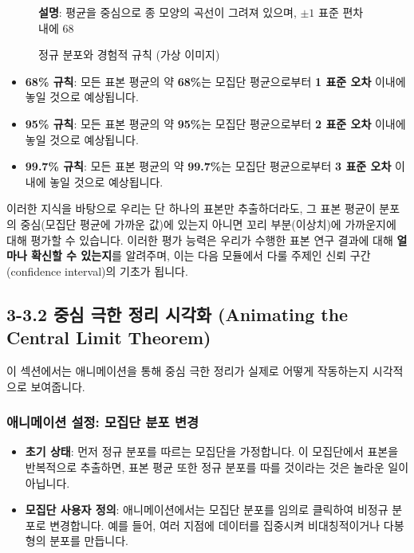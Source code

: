 \documentclass[11pt,a4paper]{book}
\theoremstyle{definition}
\begin{document}
\begin{figure}[h!]
    \centering
    \caption{정규 분포와 경험적 규칙 (가상 이미지)}
    \label{fig:empirical_rule}
    \textbf{설명}: 평균을 중심으로 종 모양의 곡선이 그려져 있으며, $\pm 1$ 표준 편차 내에 68%
\end{figure}

\begin{itemize}
    \item \textbf{68\% 규칙}: 모든 표본 평균의 약 \textbf{68\%}는 모집단 평균으로부터 \textbf{1 표준 오차} 이내에 놓일 것으로 예상됩니다.
    \item \textbf{95\% 규칙}: 모든 표본 평균의 약 \textbf{95\%}는 모집단 평균으로부터 \textbf{2 표준 오차} 이내에 놓일 것으로 예상됩니다.
    \item \textbf{99.7\% 규칙}: 모든 표본 평균의 약 \textbf{99.7\%}는 모집단 평균으로부터 \textbf{3 표준 오차} 이내에 놓일 것으로 예상됩니다.
\end{itemize}

이러한 지식을 바탕으로 우리는 단 하나의 표본만 추출하더라도, 그 표본 평균이 분포의 중심(모집단 평균에 가까운 값)에 있는지 아니면 꼬리 부분(이상치)에 가까운지에 대해 평가할 수 있습니다. 이러한 평가 능력은 우리가 수행한 표본 연구 결과에 대해 \textbf{얼마나 확신할 수 있는지}를 알려주며, 이는 다음 모듈에서 다룰 주제인 신뢰 구간(confidence interval)의 기초가 됩니다.


\subsection{3-3.2 중심 극한 정리 시각화 (Animating the Central Limit Theorem)}

이 섹션에서는 애니메이션을 통해 중심 극한 정리가 실제로 어떻게 작동하는지 시각적으로 보여줍니다.

\subsubsection*{애니메이션 설정: 모집단 분포 변경}

\begin{itemize}
    \item \textbf{초기 상태}: 먼저 정규 분포를 따르는 모집단을 가정합니다. 이 모집단에서 표본을 반복적으로 추출하면, 표본 평균 또한 정규 분포를 따를 것이라는 것은 놀라운 일이 아닙니다.
    \item \textbf{모집단 사용자 정의}: 애니메이션에서는 모집단 분포를 임의로 클릭하여 비정규 분포로 변경합니다. 예를 들어, 여러 지점에 데이터를 집중시켜 비대칭적이거나 다봉형의 분포를 만듭니다.
\end{itemize}
\end{document}
